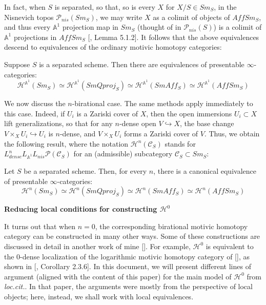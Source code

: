 In fact, when $S$ is separated, so that, so is every $X$ for $X/S\in Sm_S$, in the Nisnevich topos $\mathcal{P}_{nis}(Sm_S)$, we may write $X$ as a colimit of objects of $AffSm_S$, and thus every $\mathbb{A}^1$ projection map in $Sm_S$ (thought of in $\mathcal{P}_{nis}(S)$) is a colimit of $\mathbb{A}^1$ projections in $AffSm_S$ [\cite{MR3679884}, Lemma 5.1.2]. It follows that the above equivalences descend to equivalences of the ordinary motivic homotopy categories:
\begin{prop}
    Suppose $S$ is a separated scheme. Then there are equivalences of presentable $\infty$-categories:
$$\mathcal{H}^{\mathbb{A}^1}(Sm_S)\simeq\mathcal{H}^{\mathbb{A}^1}(SmQproj_S)\simeq  \mathcal{H}^{\mathbb{A}^1}(SmAff_S)\simeq  \mathcal{H}^{\mathbb{A}^1}(AffSm_S)$$
\end{prop}
We now discuss the $n$-birational case. The same methods apply immediately to this case. Indeed, if $U_i$ is a Zariski cover of $X$, then the open immersions $U_i\subset X$ lift generalizations, so that for any $n$-dense open $V\hookrightarrow X$, the base change $V\times _XU_i\hookrightarrow U_i$ is $n$-dense, and $V\times _XU_i$ forms a Zariski cover of $V$. Thus, we obtain the following result, where the notation $\mathcal{H}^n(\mathcal{C}_S)$ stands for $L_{dense}^nL_{\mathbb{A}^1}L_{nis}\mathcal{P}(\mathcal{C}_S)$ for an (admissible) subcategory $\mathcal{C}_S\subset Sm_S$:
\begin{thm}\label{smqproj}
 Let $S$ be a separated scheme. Then, for every $n$, there is a canonical equivalence of presentable $\infty$-categories:
   $$\mathcal{H}^{n}(Sm_S)\simeq\mathcal{H}^{n}(SmQproj_S)\simeq  \mathcal{H}^{n}(SmAff_S)\simeq  \mathcal{H}^{n}(AffSm_S)$$ 
\end{thm}

\textbf{Reducing local conditions for constructing $\mathcal{H}^0$}\label{Hb=H0}

It turns out that when $n=0$, the corresponding birational motivic homotopy category can be constructed in many other ways. Some of these constructions are discussed in detail in another work of mine [\cite{0bat}]. For example, $\mathcal{H}^0$ is equivalent to the $0$-dense localization of the logarithmic motivic homotopy category of [\cite{binda2023logarithmic}], as shown in [\cite{0bat}, Corollary 2.3.6]. In this document, we will present different lines of argument (aligned with the content of this paper) for the main model of $\mathcal{H}^0$ from \textit{loc.cit.}. In that paper, the arguments were mostly from the perspective of local objects; here, instead, we shall work with local equivalences. 


